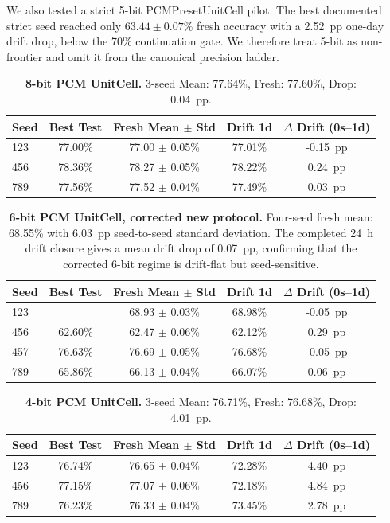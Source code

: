 We also tested a strict 5-bit PCMPresetUnitCell pilot. The best documented strict seed reached only \(63.44\pm0.07\%\) fresh accuracy with a 2.52~pp one-day drift drop, below the 70\% continuation gate. We therefore treat 5-bit as non-frontier and omit it from the canonical precision ladder.

\begin{table}[htbp]
\centering
\caption{\textbf{8-bit PCM UnitCell.} 3-seed Mean: 77.64\%, Fresh: 77.60\%, Drop: 0.04~pp.}
\label{tab:supp_8bit_pcm}
\begin{tabular}{lcccc}
\toprule
\textbf{Seed} & \textbf{Best Test} & \textbf{Fresh Mean $\pm$ Std} & \textbf{Drift 1d} & \textbf{$\Delta$ Drift (0s--1d)} \\
\midrule
123 & 77.00\% & 77.00 $\pm$ 0.05\% & 77.01\% & -0.15~pp \\
456 & 78.36\% & 78.27 $\pm$ 0.05\% & 78.22\% & 0.24~pp \\
789 & 77.56\% & 77.52 $\pm$ 0.04\% & 77.49\% & 0.03~pp \\
\bottomrule
\end{tabular}
\end{table}

\begin{table}[htbp]
\centering
\caption{\textbf{6-bit PCM UnitCell, corrected new protocol.} Four-seed fresh mean: 68.55\% with 6.03~pp seed-to-seed standard deviation. The completed 24~h drift closure gives a mean drift drop of 0.07~pp, confirming that the corrected 6-bit regime is drift-flat but seed-sensitive.}
\label{tab:supp_6bit_pcm}
\begin{tabular}{lcccc}
\toprule
\textbf{Seed} & \textbf{Best Test} & \textbf{Fresh Mean $\pm$ Std} & \textbf{Drift 1d} & \textbf{$\Delta$ Drift (0s--1d)} \\
\midrule
123 & \notrun{} & 68.93 $\pm$ 0.03\% & 68.98\% & -0.05~pp \\
456 & 62.60\% & 62.47 $\pm$ 0.06\% & 62.12\% & 0.29~pp \\
457 & 76.63\% & 76.69 $\pm$ 0.05\% & 76.68\% & -0.05~pp \\
789 & 65.86\% & 66.13 $\pm$ 0.04\% & 66.07\% & 0.06~pp \\
\bottomrule
\end{tabular}
\end{table}

\begin{table}[htbp]
\centering
\caption{\textbf{4-bit PCM UnitCell.} 3-seed Mean: 76.71\%, Fresh: 76.68\%, Drop: 4.01~pp.}
\label{tab:supp_4bit_pcm}
\begin{tabular}{lcccc}
\toprule
\textbf{Seed} & \textbf{Best Test} & \textbf{Fresh Mean $\pm$ Std} & \textbf{Drift 1d} & \textbf{$\Delta$ Drift (0s--1d)} \\
\midrule
123 & 76.74\% & 76.65 $\pm$ 0.04\% & 72.28\% & 4.40~pp \\
456 & 77.15\% & 77.07 $\pm$ 0.06\% & 72.18\% & 4.84~pp \\
789 & 76.23\% & 76.33 $\pm$ 0.04\% & 73.45\% & 2.78~pp \\
\bottomrule
\end{tabular}
\end{table}

